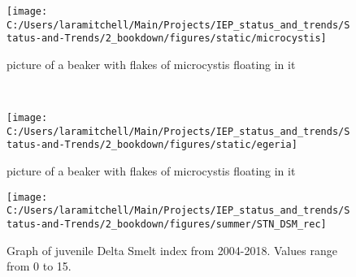 \documentclass[
]{book}
\begin{document}
\begin{panel-grid}
\begin{columns-nocenter}
\begin{column800}

\begin{figure}

{\centering \texttt{[image: C:/Users/laramitchell/Main/Projects/IEP\_status\_and\_trends/Status-and-Trends/2\_bookdown/figures/static/microcystis]} 

}

\caption{picture of a beaker with flakes of microcystis floating in it}\label{fig:unnamed-chunk-86}
\end{figure}

\end{column800}

\begin{column40}

~

\end{column40}

\begin{column800}

\begin{figure}

{\centering \texttt{[image: C:/Users/laramitchell/Main/Projects/IEP\_status\_and\_trends/Status-and-Trends/2\_bookdown/figures/static/egeria]} 

}

\caption{picture of a beaker with flakes of microcystis floating in it}\label{fig:unnamed-chunk-87}
\end{figure}

\end{column800}

\end{columns-nocenter}

\begin{columns-nocenter}

\begin{column800}

\begin{expand}

\begin{figure}
\texttt{[image: C:/Users/laramitchell/Main/Projects/IEP\_status\_and\_trends/Status-and-Trends/2\_bookdown/figures/summer/STN\_DSM\_rec]} \caption{Graph of juvenile Delta Smelt index from 2004-2018. Values range from 0 to 15.}\label{fig:unnamed-chunk-88}
\end{figure}

\end{expand}

\end{column800}


\end{columns-nocenter}
\end{panel-grid}
\end{document}

